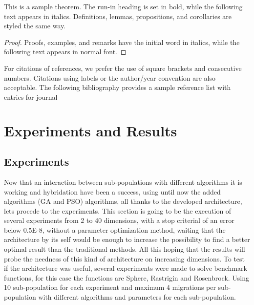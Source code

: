 \documentclass[runningheads]{llncs}
\begin{document}
\begin{theorem}
This is a sample theorem. The run-in heading is set in bold, while
the following text appears in italics. Definitions, lemmas,
propositions, and corollaries are styled the same way.
\end{theorem}
%
%
\begin{proof}
Proofs, examples, and remarks have the initial word in italics,
while the following text appears in normal font.
\end{proof}
For citations of references, we prefer the use of square brackets
and consecutive numbers. Citations using labels or the author/year
convention are also acceptable. The following bibliography provides
a sample reference list with entries for journal


\section{Experiments and Results}
\subsection{Experiments}
Now that an interaction between sub-populations with different algorithms it is working and  hybridation have been a success, using until now the added algorithms (GA and PSO) algorithms, all thanks to the 
developed architecture, lets procede to the experiments.
This section is going to be the execution of several experiments from 2 to 40 dimensions, with a stop criterial 
of an error below  0.5E-8, without a parameter optimization method, waiting that the architecture by its self
would be enough to increase the possibility to find a better optimal result than the traditional methods.
All this hoping that the results will probe the needness of this kind of architecture on increasing dimensions.
To test if the architecture was useful, several experiments were made to solve
benchmark functions, for this case the functions are Sphere, Rastrigin and Rosenbrock.
Using 10 sub-population for each experiment and maximum 4 migrations per sub-population with different algorithms and parameters for each sub-population.
\end{document}

